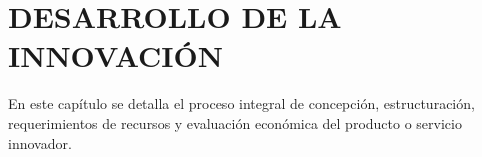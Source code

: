 \chapter{DESARROLLO DE LA INNOVACIÓN}
\label{chap:desarrollo_innovacion}

En este capítulo se detalla el proceso integral de concepción, estructuración, requerimientos de recursos y evaluación económica del producto o servicio innovador.





